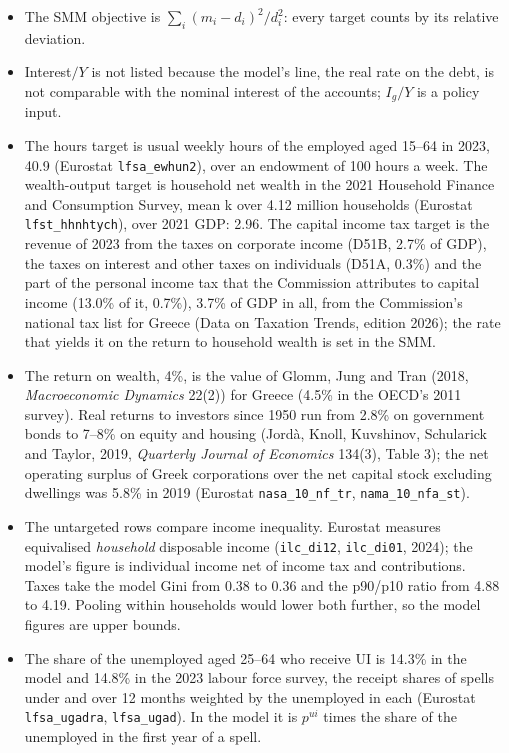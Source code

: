 \documentclass[11pt,a4paper]{article}
\newcommand{\EUR}[1]{\texteuro#1}
\begin{document}
\begin{itemize}
\item The SMM objective is $\sum_i (m_i-d_i)^2/d_i^2$: every target counts by
  its relative deviation.
\item Interest$/Y$ is not listed because the model's line, the real rate on
  the debt, is not comparable with the nominal interest of the accounts;
  $I_g/Y$ is a policy input.
\item The hours target is usual weekly hours of the employed aged 15--64 in
  2023, 40.9 (Eurostat \texttt{lfsa\_ewhun2}), over an endowment of 100
  hours a week. The wealth-output target is household net wealth in the
  2021 Household Finance and Consumption Survey, mean \EUR{132.7}k over
  4.12 million households (Eurostat \texttt{lfst\_hhnhtych}), over 2021 GDP:
  2.96. The capital income tax target is the revenue of 2023 from the taxes
  on corporate income (D51B, 2.7\% of GDP), the taxes on interest and other
  taxes on individuals (D51A, 0.3\%) and the part of the personal income tax
  that the Commission attributes to capital income (13.0\% of it, 0.7\%),
  3.7\% of GDP in all, from the Commission's national tax list for Greece
  (Data on Taxation Trends, edition 2026); the rate that yields it on the
  return to household wealth is set in the SMM.
\item The return on wealth, 4\%, is the value of Glomm, Jung and Tran
  (2018, \emph{Macroeconomic Dynamics} 22(2)) for Greece (4.5\% in the
  OECD's 2011 survey). Real returns to investors since 1950 run from 2.8\%
  on government bonds to 7--8\% on equity and housing (Jord\`a, Knoll,
  Kuvshinov, Schularick and Taylor, 2019, \emph{Quarterly Journal of
  Economics} 134(3), Table 3); the net operating surplus of
  Greek corporations over the net capital stock excluding dwellings was
  5.8\% in 2019 (Eurostat \texttt{nasa\_10\_nf\_tr}, \texttt{nama\_10\_nfa\_st}).
\item The untargeted rows compare income inequality. Eurostat measures
  equivalised \emph{household} disposable income (\texttt{ilc\_di12},
  \texttt{ilc\_di01}, 2024); the model's figure is individual income net of
  income tax and contributions. Taxes take the model Gini from 0.38 to
  0.36 and the p90/p10 ratio from 4.88 to 4.19. Pooling within households
  would lower both further, so the model figures are upper bounds.
\item The share of the unemployed aged 25--64 who receive UI is 14.3\% in
  the model and 14.8\% in the 2023 labour force survey, the receipt shares
  of spells under and over 12 months weighted by the unemployed in each
  (Eurostat \texttt{lfsa\_ugadra}, \texttt{lfsa\_ugad}). In the model it is
  $p^{ui}$ times the share of the unemployed in the first year of a spell.
\end{itemize}
\end{document}
